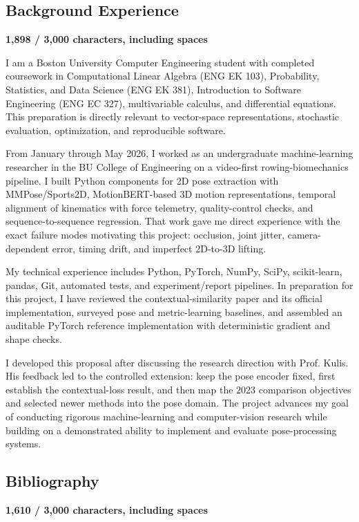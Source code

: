 \documentclass[11pt,letterpaper]{article}
\newcommand{\CharCount}[2]{%
  \begin{flushright}
    \vspace{-7pt}
    {\color{Muted}\bfseries\footnotesize #1 / #2 characters, including spaces}
  \end{flushright}
  \vspace{-3pt}
}
\begin{document}
\subsection*{Background Experience}
\CharCount{1,898}{3,000}

I am a Boston University Computer Engineering student with completed coursework in Computational Linear Algebra (ENG EK 103), Probability, Statistics, and Data Science (ENG EK 381), Introduction to Software Engineering (ENG EC 327), multivariable calculus, and differential equations. This preparation is directly relevant to vector-space representations, stochastic evaluation, optimization, and reproducible software.

From January through May 2026, I worked as an undergraduate machine-learning researcher in the BU College of Engineering on a video-first rowing-biomechanics pipeline. I built Python components for 2D pose extraction with MMPose/Sports2D, MotionBERT-based 3D motion representations, temporal alignment of kinematics with force telemetry, quality-control checks, and sequence-to-sequence regression. That work gave me direct experience with the exact failure modes motivating this project: occlusion, joint jitter, camera-dependent error, timing drift, and imperfect 2D-to-3D lifting.

My technical experience includes Python, PyTorch, NumPy, SciPy, scikit-learn, pandas, Git, automated tests, and experiment/report pipelines. In preparation for this project, I have reviewed the contextual-similarity paper and its official implementation, surveyed pose and metric-learning baselines, and assembled an auditable PyTorch reference implementation with deterministic gradient and shape checks.

I developed this proposal after discussing the research direction with Prof. Kulis. His feedback led to the controlled extension: keep the pose encoder fixed, first establish the contextual-loss result, and then map the 2023 comparison objectives and selected newer methods into the pose domain. The project advances my goal of conducting rigorous machine-learning and computer-vision research while building on a demonstrated ability to implement and evaluate pose-processing systems.

\subsection*{Bibliography}
\CharCount{1,610}{3,000}
\end{document}
